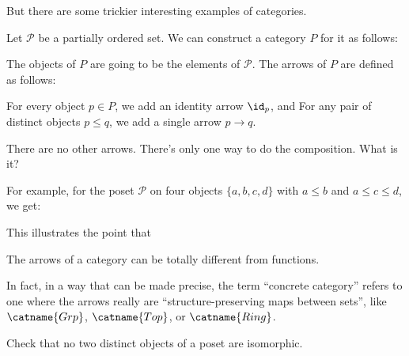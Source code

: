 \documentclass[11pt]{scrreprt}
\begin{document}
But there are some trickier interesting examples of categories.
\begin{example}
	Let $\mathcal P$ be a partially ordered set.
	We can construct a category $P$ for it as follows:
	\begin{itemize}
		\ii The objects of $P$ are going to be the elements of $\mathcal P$.
		\ii The arrows of $P$ are defined as follows:
		\begin{itemize}
			\ii For every object $p \in P$, we add an identity arrow $\id_p$, and
			\ii For any pair of distinct objects $p \le q$, we add a single arrow $p \to q$.
		\end{itemize}
		There are no other arrows.
		\ii There's only one way to do the composition. What is it?
	\end{itemize}
\end{example}
For example, for the poset $\mathcal P$ on four objects $\{a,b,c,d\}$ with $a \le b$ and $a \le c \le d$, we get:
\begin{center}
\end{center}

This illustrates the point that
\begin{moral}
	The arrows of a category can be totally different from functions.
\end{moral}
In fact, in a way that can be made precise, the term ``concrete category'' refers
to one where the arrows really are ``structure-preserving maps between sets'',
like $\catname{Grp}$, $\catname{Top}$, or $\catname{Ring}$.

\begin{ques}
	Check that no two distinct objects of a poset are isomorphic.
\end{ques}
\end{document}
